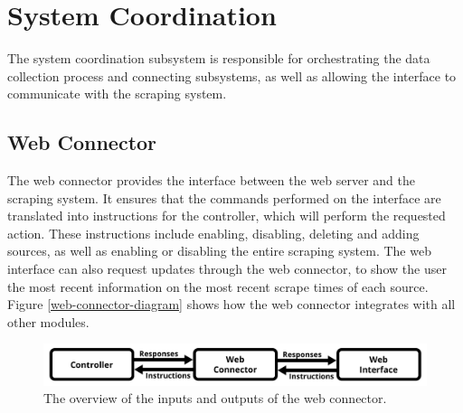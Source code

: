 \documentclass{l4proj}
\begin{document}
\section{System Coordination}
The system coordination subsystem is responsible for orchestrating the data collection process and connecting subsystems, as well as allowing the interface to communicate with the scraping system.
\subsection{Web Connector}
The web connector provides the interface between the web server and the scraping system. It ensures that the commands performed on the interface are translated into instructions for the controller, which will perform the requested action. These instructions include enabling, disabling, deleting and adding sources, as well as enabling or disabling the entire scraping system. The web interface can also request updates through the web connector, to show the user the most recent information on the most recent scrape times of each source. Figure \ref{web-connector-diagram} shows how the web connector integrates with all other modules.
 \begin{figure}[h]
\centering
\includegraphics[width=\textwidth]{images/Web-connector-diagram.png}
\caption{The overview of the inputs and outputs of the web connector.}
\label{fig:web-connector_diagram}
\end{figure}
\end{document}
